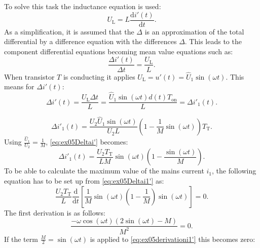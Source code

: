 
\begin{solutionblock}
    To solve this task the inductance equation is used:
    \begin{equation}
        U_{\mathrm{L}} = L \frac{\mathrm{d}i'(t)}{\mathrm{d}t}.
    \end{equation}
    As a simplification, it is assumed that the $\Delta$ is an approximation of the total differential by a difference equation with the differences $\Delta$. This leads to the component differential equations becoming mean value equations such as:
    \begin{equation}
        \frac{\Delta i'(t)}{\Delta t} = \frac{U_{\mathrm{L}}}{L}.
    \end{equation}
    When transistor $T$ is conducting it applies $U_{\mathrm{L}} = u'(t) = \hat U_{\mathrm{1}} \sin(\omega t)$.
    This means for $\Delta i'(t)$:
\begin{equation}
    \Delta i'(t) = \frac{ U_{\mathrm{L}} \Delta t}{L} = \frac{\hat U_{\mathrm{1}} \sin(\omega t) d(t) T_{\mathrm{on}}}{L} = \Delta i'_{\mathrm{1}}(t).
\end{equation}


 \begin{equation}
     \Delta i'_{\mathrm{1}}(t) = \frac{U_{\mathrm{2}}\hat U_{\mathrm{1}}\sin (\omega t)}{U_{\mathrm{2}}L}(1-\frac{1}{M}\sin(\omega t)) T_{\mathrm{T}}.\label{eq:ex05Deltai'}
 \end{equation}
 Using $\frac{\hat U_{\mathrm{1}}}{U_{\mathrm{2}}} = \frac{1}{M}$, \eqref{eq:ex05Deltai'} becomes:
 \begin{equation}
     \Delta i'_{\mathrm{1}}(t) = \frac{U_{\mathrm{2}}T_{\mathrm{T}}}{LM}\sin (\omega t)(1-\frac{\sin(\omega t)}{M}). \label{eq:ex05Deltai1'}
 \end{equation}
   To be able to calculate the maximum value of the mains current
    $i_\mathrm{1}$, the following equation has to be set up from \eqref{eq:ex05Deltai1'} as:
    \begin{equation}
        \frac{U_{\mathrm{2}}T_{\mathrm{T}}}{L} \frac{\mathrm{d}}{\mathrm{d}t}\left[\frac{1}{M}\sin(\omega t)\left(1-\frac{1}{M}\right)\sin(\omega t)\right] =0.
    \end{equation}
    The first derivation is as follows:
    \begin{equation}
        \frac{-\omega \cos(\omega t)(2\sin(\omega t)-M)}{M^2}=0.\label{eq:ex05derivationi1'}
    \end{equation}
    If the term $\frac{M}{2}=\sin(\omega t)$ is applied to \eqref{eq:ex05derivationi1'} this becomes zero:


\end{solutionblock}
